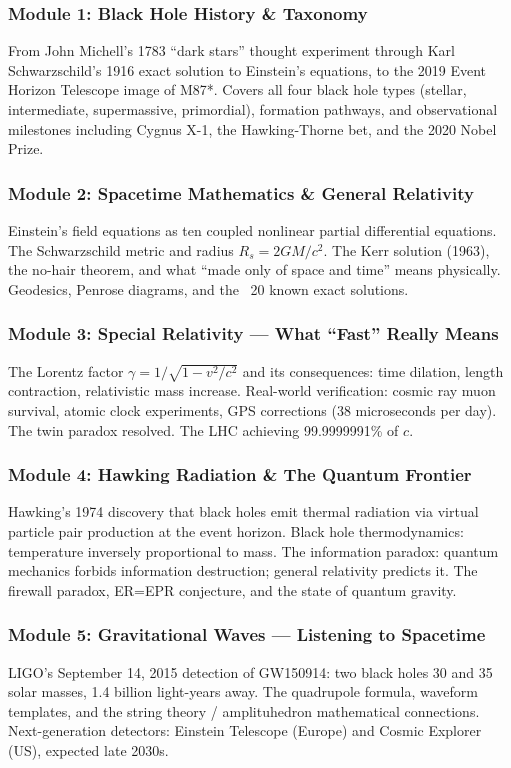 \documentclass[11pt,letterpaper]{article}
\begin{document}
\subsubsection{Module 1: Black Hole History \& Taxonomy}
From John Michell's 1783 ``dark stars'' thought experiment through Karl Schwarzschild's 1916 exact solution to Einstein's equations, to the 2019 Event Horizon Telescope image of M87*. Covers all four black hole types (stellar, intermediate, supermassive, primordial), formation pathways, and observational milestones including Cygnus X-1, the Hawking-Thorne bet, and the 2020 Nobel Prize.

\subsubsection{Module 2: Spacetime Mathematics \& General Relativity}
Einstein's field equations as ten coupled nonlinear partial differential equations. The Schwarzschild metric and radius $R_s = 2GM/c^2$. The Kerr solution (1963), the no-hair theorem, and what ``made only of space and time'' means physically. Geodesics, Penrose diagrams, and the ~20 known exact solutions.

\subsubsection{Module 3: Special Relativity --- What ``Fast'' Really Means}
The Lorentz factor $\gamma = 1/\sqrt{1-v^2/c^2}$ and its consequences: time dilation, length contraction, relativistic mass increase. Real-world verification: cosmic ray muon survival, atomic clock experiments, GPS corrections (38 microseconds per day). The twin paradox resolved. The LHC achieving 99.9999991\% of $c$.

\subsubsection{Module 4: Hawking Radiation \& The Quantum Frontier}
Hawking's 1974 discovery that black holes emit thermal radiation via virtual particle pair production at the event horizon. Black hole thermodynamics: temperature inversely proportional to mass. The information paradox: quantum mechanics forbids information destruction; general relativity predicts it. The firewall paradox, ER=EPR conjecture, and the state of quantum gravity.

\subsubsection{Module 5: Gravitational Waves --- Listening to Spacetime}
LIGO's September 14, 2015 detection of GW150914: two black holes 30 and 35 solar masses, 1.4 billion light-years away. The quadrupole formula, waveform templates, and the string theory / amplituhedron mathematical connections. Next-generation detectors: Einstein Telescope (Europe) and Cosmic Explorer (US), expected late 2030s.
\end{document}
